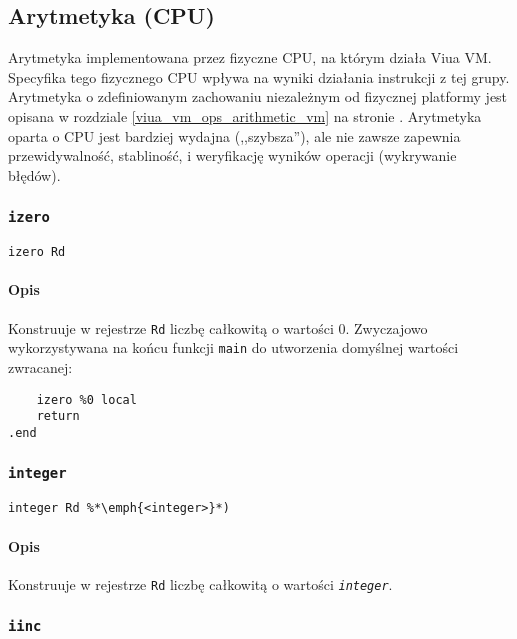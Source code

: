 \subsection{Arytmetyka (CPU)}
\label{viua_vm_ops_arithmetic_cpu}

Arytmetyka implementowana przez fizyczne CPU, na którym działa Viua VM.
Specyfika tego fizycznego CPU wpływa na wyniki działania instrukcji z tej grupy.
Arytmetyka o zdefiniowanym zachowaniu niezależnym od fizycznej platformy jest
opisana w rozdziale \ref{viua_vm_ops_arithmetic_vm} na stronie
\pageref{viua_vm_ops_arithmetic_vm}. Arytmetyka oparta o CPU jest
bardziej wydajna (,,szybsza''), ale nie zawsze zapewnia przewidywalność,
stabliność, i weryfikację wyników operacji (wykrywanie błędów).

\subsubsection{\texttt{izero}}

\begin{lstlisting}
izero Rd
\end{lstlisting}

\paragraph*{Opis} Konstruuje w rejestrze \texttt{Rd} liczbę całkowitą o wartości 0.
Zwyczajowo wykorzystywana na końcu funkcji \texttt{main} do utworzenia domyślnej wartości zwracanej:

\begin{lstlisting}
	izero %0 local
	return
.end
\end{lstlisting}

\subsubsection{\texttt{integer}}

\begin{lstlisting}
integer Rd %*\emph{<integer>}*)
\end{lstlisting}

\paragraph*{Opis} Konstruuje w rejestrze \texttt{Rd} liczbę całkowitą o wartości \emph{\texttt{integer}}.

\subsubsection{\texttt{iinc}}
